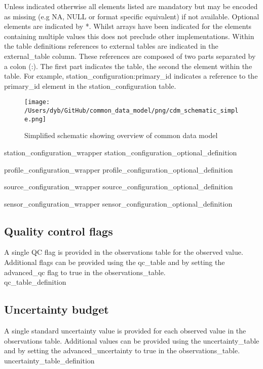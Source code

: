 \documentclass[a4paper,12pt]{article}
\begin{document}
Unless indicated otherwise all elements listed are mandatory but may be encoded as missing (e.g NA, NULL or format specific equivalent) if not available. Optional elements are indicated by *. Whilst arrays have been indicated for the elements containing multiple values this does not preclude other implementations. Within the table definitions references to external tables are indicated in the external\_table column. These references are composed of two parts separated by a colon (:). The first part indicates the table, the second the element within the table. For example, station\_configuration:primary\_id indicates a reference to the primary\_id element in the station\_configuration table.\\

\begin{landscape}
\begin{figure}
\centering
\texttt{[image: /Users/dyb/GitHub/common\_data\_model/png/cdm\_schematic\_simple.png]}
\caption {Simplified schematic showing overview of common data model}
\end{figure}
\end{landscape}





 {station_configuration_wrapper}
 {station_configuration_optional_definition}

 {profile_configuration_wrapper}
 {profile_configuration_optional_definition}


 {source_configuration_wrapper}
 {source_configuration_optional_definition}

 {sensor_configuration_wrapper}
 {sensor_configuration_optional_definition}


\subsection {Quality control flags}
A single QC flag is provided in the observations table for the observed value. Additional flags can be provided using the qc\_table and by setting the advanced\_qc flag to true in the observations\_table.\\
 {qc_table_definition}

\subsection {Uncertainty budget}
A single standard uncertainty value is provided for each observed value in the observations table. Additional values can be provided using the uncertainty\_table and by setting the advanced\_uncertainty to true in the observations\_table.\\
 {uncertainty_table_definition}
\end{document}
